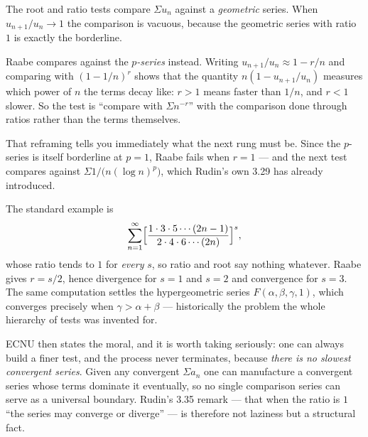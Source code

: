 \begin{unpack}
The root and ratio tests compare $\Sigma u_n$ against a \emph{geometric}
series. When $u_{n+1}/u_n \to 1$ the comparison is vacuous, because the
geometric series with ratio $1$ is exactly the borderline.

Raabe compares against the \emph{$p$-series} instead. Writing
$u_{n+1}/u_n \approx 1 - r/n$ and comparing with $(1-1/n)^r$ shows that the
quantity $n(1 - u_{n+1}/u_n)$ measures which power of $n$ the terms decay
like: $r > 1$ means faster than $1/n$, and $r < 1$ slower. So the test is
``compare with $\Sigma n^{-r}$'' with the comparison done through ratios
rather than the terms themselves.

That reframing tells you immediately what the next rung must be. Since the
$p$-series is itself borderline at $p=1$, Raabe fails when $r=1$ --- and the
next test compares against $\Sigma 1/\bigl(n(\log n)^{p}\bigr)$, which
Rudin's own 3.29 has already introduced.
\end{unpack}

\begin{deeper}
The standard example is
\[ \sum_{n=1}^{\infty}
   \Bigl[\frac{1 \cdot 3 \cdot 5 \cdots (2n-1)}
              {2 \cdot 4 \cdot 6 \cdots (2n)}\Bigr]^{s}, \]
whose ratio tends to $1$ for \emph{every} $s$, so ratio and root say nothing
whatever. Raabe gives $r = s/2$, hence divergence for $s = 1$ and $s = 2$ and
convergence for $s = 3$. The same computation settles the hypergeometric
series $F(\alpha,\beta,\gamma,1)$, which converges precisely when
$\gamma > \alpha + \beta$ --- historically the problem the whole hierarchy of
tests was invented for.

ECNU then states the moral, and it is worth taking seriously: one can always
build a finer test, and the process never terminates, because \emph{there is
no slowest convergent series}. Given any convergent $\Sigma a_n$ one can
manufacture a convergent series whose terms dominate it eventually, so no
single comparison series can serve as a universal boundary. Rudin's 3.35
remark --- that when the ratio is $1$ ``the series may converge or diverge''
--- is therefore not laziness but a structural fact.
\end{deeper}


